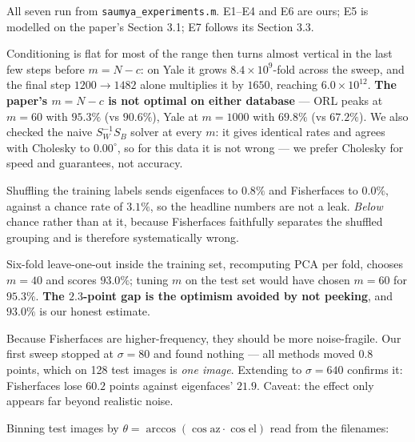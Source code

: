 \documentclass[11pt]{article}
\newcommand{\Sw}{S_W}
\newcommand{\Sb}{S_B}
\begin{document}
All seven run from \texttt{saumya\_experiments.m}. E1--E4 and E6 are ours; E5
is modelled on the paper's Section 3.1; E7 follows its Section 3.3.

\begin{description}[leftmargin=1.1em,style=nextline,itemsep=2pt]

\item[E1 --- $\operatorname{cond}(\Sw)$ against $m$ (ORL and Yale).]
Conditioning is flat for most of the range then turns almost vertical in the
last few steps before $m=N-c$: on Yale it grows $8.4\times10^{9}$-fold across
the sweep, and the final step $1200\to1482$ alone multiplies it by $1650$,
reaching $6.0\times10^{12}$. \textbf{The paper's $m=N-c$ is not optimal on either
database} --- ORL peaks at $m=60$ with $95.3\%$ (vs $90.6\%$), Yale at
$m=1000$ with $69.8\%$ (vs $67.2\%$). We also checked the naive
$\Sw^{-1}\Sb$ solver at every $m$: it gives identical rates and agrees with
Cholesky to $0.00^\circ$, so for this data it is not wrong --- we prefer
Cholesky for speed and guarantees, not accuracy.

\item[E2 --- Label permutation (ORL).]
Shuffling the training labels sends eigenfaces to $0.8\%$ and Fisherfaces to
$0.0\%$, against a chance rate of $3.1\%$, so the headline numbers are not a
leak. \emph{Below} chance rather than at it, because Fisherfaces faithfully
separates the shuffled grouping and is therefore systematically wrong.

\item[E3 --- Cross-validated $m$ (ORL).]
Six-fold leave-one-out inside the training set, recomputing PCA per fold,
chooses $m=40$ and scores $\mathbf{93.0\%}$; tuning $m$ on the test set would
have chosen $m=60$ for $95.3\%$. \textbf{The $2.3$-point gap is the optimism
avoided by not peeking}, and $93.0\%$ is our honest estimate.

\item[E4 --- Noise robustness (ORL), a prediction tested.]
Because Fisherfaces are higher-frequency, they should be more noise-fragile.
Our first sweep stopped at $\sigma=80$ and found nothing --- all methods moved
$0.8$ points, which on 128 test images is \emph{one image}. Extending to
$\sigma=640$ confirms it: Fisherfaces lose $60.2$ points against eigenfaces'
$21.9$. Caveat: the effect only appears far beyond realistic noise.

\item[E5 --- Error against lighting angle (Yale).]
Binning test images by $\theta=\arccos(\cos\text{az}\cdot\cos\text{el})$ read
from the filenames:


\end{description}
\end{document}
